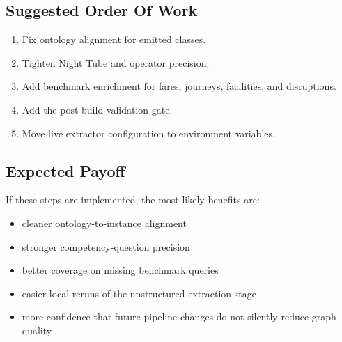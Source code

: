 \documentclass[
  11pt,
  a4paper,
]{article}
\providecommand{\tightlist}{%
  \setlength{\itemsep}{0pt}\setlength{\parskip}{0pt}}
\begin{document}
\subsection{Suggested Order Of Work}\label{suggested-order-of-work}

\begin{enumerate}
\def\labelenumi{\arabic{enumi}.}
\tightlist
\item
  Fix ontology alignment for emitted classes.
\item
  Tighten Night Tube and operator precision.
\item
  Add benchmark enrichment for fares, journeys, facilities, and
  disruptions.
\item
  Add the post-build validation gate.
\item
  Move live extractor configuration to environment variables.
\end{enumerate}

\subsection{Expected Payoff}\label{expected-payoff}

If these steps are implemented, the most likely benefits are:

\begin{itemize}
\tightlist
\item
  cleaner ontology-to-instance alignment
\item
  stronger competency-question precision
\item
  better coverage on missing benchmark queries
\item
  easier local reruns of the unstructured extraction stage
\item
  more confidence that future pipeline changes do not silently reduce
  graph quality
\end{itemize}
\end{document}
